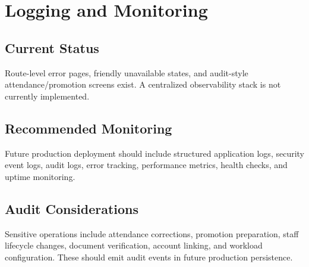\chapter{Logging and Monitoring}
\section{Current Status}
\statuspartial{} Route-level error pages, friendly unavailable states, and audit-style attendance/promotion screens exist. A centralized observability stack is not currently implemented.

\section{Recommended Monitoring}
Future production deployment should include structured application logs, security event logs, audit logs, error tracking, performance metrics, health checks, and uptime monitoring.

\section{Audit Considerations}
Sensitive operations include attendance corrections, promotion preparation, staff lifecycle changes, document verification, account linking, and workload configuration. These should emit audit events in future production persistence.
